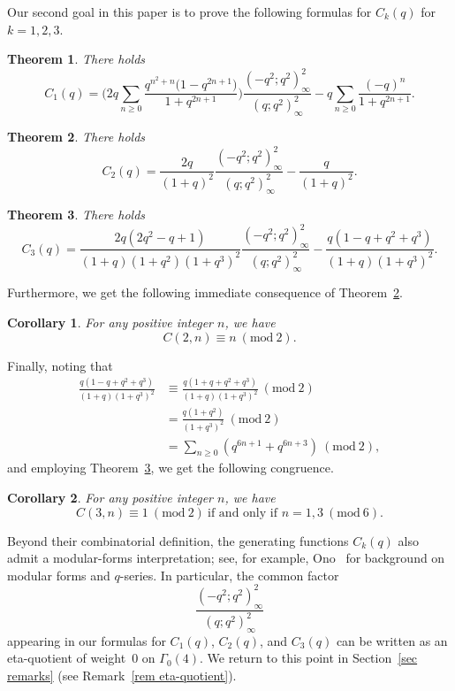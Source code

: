 \documentclass[reqno]{amsart}
\theoremstyle{definition}
\theoremstyle{plain}
\newtheorem{theorem}    {Theorem}
\newtheorem{corollary}  {Corollary}
\theoremstyle{remark}
\numberwithin{equation}{section}
\newcommand{\Mod}[1]{\ (\mathrm{mod}\ #1)}
\newcommand{\fr}{\frac}
\begin{document}
Our second goal in this paper is to prove the following formulas for $C_k(q)$ for $k=1,2,3$.
%
\begin{theorem}\label{thm C1}
There holds
\begin{equation}
C_1(q)=
\Big(
2q\sum_{n\ge0}
     \frac{q^{n^{2}+n}\bigl(1-q^{2n+1}\bigr)}
          {1+q^{2n+1}}
\Big) \fr{(-q^2;q^2)_\infty^2}{(q;q^2)_\infty^2}
-q\sum_{n\ge0}\frac{(-q)^{n}}{1+q^{2n+1}}.
\end{equation}
\end{theorem}
%
\begin{theorem}\label{thm C21}
There holds
\begin{equation}\label{C21-id}
C_{2}(q) = \fr{2q}{(1+q)^2}\fr{(-q^2;q^2)_\infty^2}{(q;q^2)_\infty^2} - \fr{q}{(1+q)^2}.
\end{equation}
\end{theorem}
%
\begin{theorem}\label{thm C31}
There holds
\begin{equation}\label{C31-id}
C_{3}(q) = \frac{2q(2q^2 - q + 1)}{(1+q)(1+q^2)(1+q^3)^2}\fr{(-q^2;q^2)_\infty^2}{(q;q^2)_\infty^2}
- \fr{q(1-q+q^2+q^3)}{(1+q)(1+q^3)^2}.
\end{equation}
\end{theorem}
Furthermore, we get the following immediate consequence of Theorem~\ref{thm C21}.
\begin{corollary}\label{cor cong2}
For any positive integer $n$, we have
\[
C(2,n) \equiv n \Mod{2}.
\]
\end{corollary}
%
Finally, noting that
\begin{align*}
\fr{q(1-q+q^2+q^3)}{(1+q)(1+q^3)^2} &\equiv \fr{q(1+q+q^2+q^3)}{(1+q)(1+q^3)^2} \Mod{2} \\
&= \fr{q(1+q^2)}{(1+q^3)^2} \Mod{2} \\
&= \sum_{n\geq 0} (q^{6n+1}+q^{6n+3}) \Mod{2},
\end{align*}
and employing Theorem~\ref{thm C31}, we get the following congruence.
%
\begin{corollary}\label{cor cong3}
For any positive integer $n$, we have
\begin{equation*}
C(3,n) \equiv 1\Mod{2}\ \text{if and only if\ } n=1, 3 \Mod{6}.
\end{equation*}
\end{corollary}
%
Beyond their combinatorial definition, the generating functions $C_k(q)$ also admit a modular-forms interpretation; see, for example, Ono~\cite{Ono} for background on modular forms and $q$-series. In particular, the common factor
\[
\frac{(-q^2;q^2)_\infty^2}{(q;q^2)_\infty^2}
\]
appearing in our formulas for $C_1(q)$, $C_2(q)$, and $C_3(q)$ can be written as an eta-quotient of weight~$0$ on $\Gamma_0(4)$. We return to this point in Section~\ref{sec remarks} (see Remark~\ref{rem eta-quotient}).
%
\end{document}
